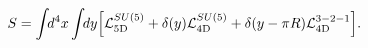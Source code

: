 \begin{equation}
  S = \int\!\!d^4x \int\!\!dy 
    \Bigl[ {\cal L}_{\rm 5D}^{SU(5)} 
    + \delta(y) {\cal L}_{\rm 4D}^{SU(5)}
    + \delta(y-\pi R) {\cal L}_{\rm 4D}^{3-2-1} \Bigr].
\label{eq:Lag-SU5}
\end{equation}

